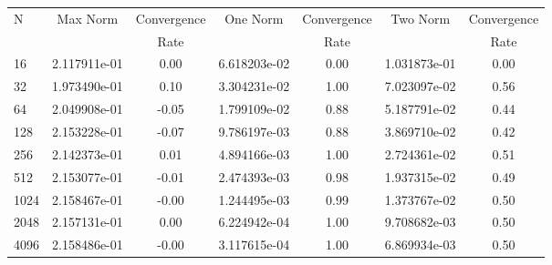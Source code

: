 \documentclass[12pt]{article}
\begin{document}
	\begin{tabular}{l|c|c|c|c|c|c}
		N&Max Norm&Convergence&One Norm&Convergence&Two Norm&Convergence\\
		&&Rate&&Rate&&Rate\\
		\hline
		16&2.117911e-01&0.00&6.618203e-02&0.00&1.031873e-01&0.00\\
		\hline
		32&1.973490e-01&0.10&3.304231e-02&1.00&7.023097e-02&0.56\\
		\hline
		64&2.049908e-01&-0.05&1.799109e-02&0.88&5.187791e-02&0.44\\
		\hline
		128&2.153228e-01&-0.07&9.786197e-03&0.88&3.869710e-02&0.42\\
		\hline
		256&2.142373e-01&0.01&4.894166e-03&1.00&2.724361e-02&0.51\\
		\hline
		512&2.153077e-01&-0.01&2.474393e-03&0.98&1.937315e-02&0.49\\
		\hline
		1024&2.158467e-01&-0.00&1.244495e-03&0.99&1.373767e-02&0.50\\
		\hline
		2048&2.157131e-01&0.00&6.224942e-04&1.00&9.708682e-03&0.50\\
		\hline
		4096&2.158486e-01&-0.00&3.117615e-04&1.00&6.869934e-03&0.50\\
	\end{tabular}
\end{document}
